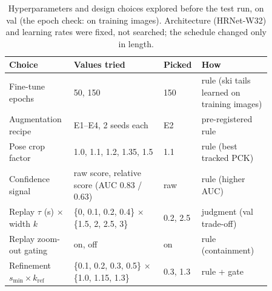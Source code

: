 \documentclass{article}
\begin{document}
\begin{table}[h]
  \centering
  \small
  \begin{tabular}{p{0.21\linewidth}p{0.32\linewidth}p{0.08\linewidth}p{0.25\linewidth}}
    \toprule
    Choice & Values tried & Picked & How \\
    \midrule
    Fine-tune epochs & 50, 150 & 150 & rule (ski tails learned on training images) \\
    Augmentation recipe & E1--E4, 2 seeds each & E2 & pre-registered rule \\
    Pose crop factor & 1.0, 1.1, 1.2, 1.35, 1.5 & 1.1 & rule (best tracked PCK) \\
    Confidence signal & raw score, relative score (AUC 0.83 / 0.63) & raw & rule (higher AUC) \\
    Replay $\tau$ (s) $\times$ width $k$ & \{0, 0.1, 0.2, 0.4\} $\times$ \{1.5, 2, 2.5, 3\} & 0.2, 2.5 & judgment (val trade-off) \\
    Replay zoom-out gating & on, off & on & rule (containment) \\
    Refinement $s_{\min} \times k_{\mathrm{ref}}$ & \{0.1, 0.2, 0.3, 0.5\} $\times$ \{1.0, 1.15, 1.3\} & 0.3, 1.3 & rule + gate \\
    \bottomrule
  \end{tabular}
  \caption{Hyperparameters and design choices explored before the test run, on val (the epoch check: on training
  images). Architecture (HRNet-W32) and learning rates were fixed, not searched; the schedule changed only in length.}
  \label{tab:choices}
\end{table}
\end{document}
